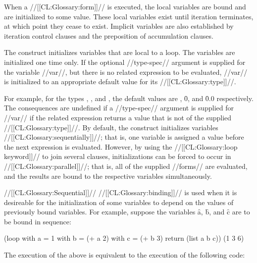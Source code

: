 \endsubsubsubsubsection%

\endsubsubsubsection%

\endsubsubsection%

 
When a  //[[CL:Glossary:form]]// is executed, the local variables are bound and are
initialized to some value.  These local variables exist until 
iteration terminates, at which point they cease to exist.  
Implicit variables are also established by iteration control clauses and the
 preposition of accumulation clauses.

The  construct initializes variables that are local to 
a loop.  The variables are initialized one time only.
If the optional //type-spec// argument is supplied for the variable 
//var//, but there is no related expression to be evaluated, //var//
is initialized to an appropriate default value for its //[[CL:Glossary:type]]//.


For example, for the types , , 
and ,
the default values are \nil, \f{0}, and \f{0.0} respectively.
The consequences are undefined if a 
//type-spec// argument is supplied for //var// if
the related expression returns a value that is not of the supplied 
//[[CL:Glossary:type]]//.
By default, the  construct initializes variables
//[[CL:Glossary:sequentially]]//; that is, one variable is assigned a value before the
next expression is evaluated.  However, by using the //[[CL:Glossary:loop keyword]]// 
to join several  clauses, 
initializations can be forced to occur in //[[CL:Glossary:parallel]]//; that 
is, all of the supplied
//forms// are evaluated, and the results are bound to the respective
variables simultaneously.



//[[CL:Glossary:Sequential]]// //[[CL:Glossary:binding]]// is used when it is desireable for the initialization of
some variables to depend on the values of previously bound variables.
For example, suppose the variables \f{a}, \f{b}, and \f{c} are to be bound in sequence:
 
\code
 (loop with a = 1 
       with b = (+ a 2) 
       with c = (+ b 3)
       return (list a b c))
\EV (1 3 6)
\endcode
 
The execution of the above  is equivalent to the execution of
the following code:
 
